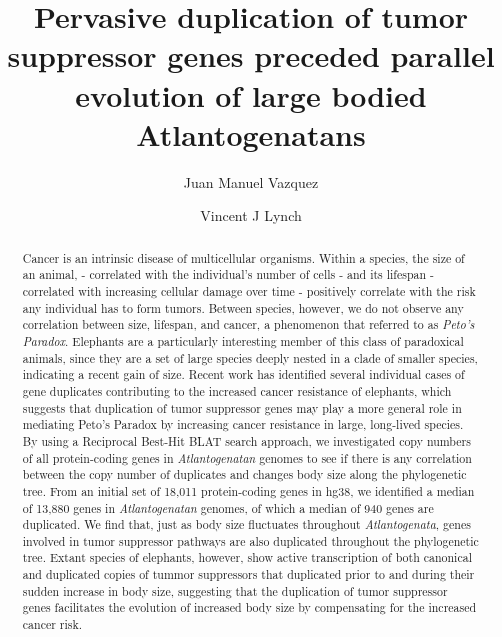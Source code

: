 \documentclass[]{elsarticle} %
\begin{document}
\begin{frontmatter}

  \title{Pervasive duplication of tumor suppressor genes preceded parallel evolution of large bodied Atlantogenatans}
    \author[University of Chicago]{Juan Manuel Vazquez}
  
    \author[SUNY Buffalo]{Vincent J Lynch}
  
      \address[University of Chicago]{Department of Human Genetics, 920 East 58th St, Chicago, IL, 60637}
    \address[SUNY Buffalo]{Department of Biological Sciences, 551 Cooke Hall, Buffalo NY, 14260}
    
  \begin{abstract}
  Cancer is an intrinsic disease of multicellular organisms. Within a species, the size of an animal, - correlated with the individual's number of cells - and its lifespan - correlated with increasing cellular damage over time - positively correlate with the risk any individual has to form tumors. Between species, however, we do not observe any correlation between size, lifespan, and cancer, a phenomenon that referred to as \emph{Peto's Paradox}. Elephants are a particularly interesting member of this class of paradoxical animals, since they are a set of large species deeply nested in a clade of smaller species, indicating a recent gain of size. Recent work has identified several individual cases of gene duplicates contributing to the increased cancer resistance of elephants, which suggests that duplication of tumor suppressor genes may play a more general role in mediating Peto's Paradox by increasing cancer resistance in large, long-lived species.
  By using a Reciprocal Best-Hit BLAT search approach, we investigated copy numbers of all protein-coding genes in \emph{Atlantogenatan} genomes to see if there is any correlation between the copy number of duplicates and changes body size along the phylogenetic tree. From an initial set of 18,011 protein-coding genes in hg38, we identified a median of 13,880 genes in \emph{Atlantogenatan} genomes, of which a median of 940 genes are duplicated. We find that, just as body size fluctuates throughout \emph{Atlantogenata}, genes involved in tumor suppressor pathways are also duplicated throughout the phylogenetic tree. Extant species of elephants, however, show active transcription of both canonical and duplicated copies of tummor suppressors that duplicated prior to and during their sudden increase in body size, suggesting that the duplication of tumor suppressor genes facilitates the evolution of increased body size by compensating for the increased cancer risk.
  \end{abstract}
  
 \end{frontmatter}
\end{document}
